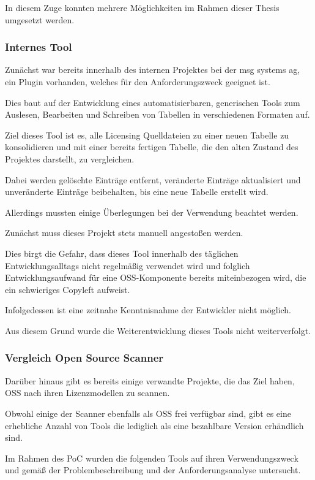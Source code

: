 In diesem Zuge konnten mehrere Möglichkeiten im Rahmen dieser Thesis umgesetzt werden.

\subsubsection{Internes Tool}

Zunächst war bereits innerhalb des internen Projektes bei der msg systems ag, ein Plugin vorhanden, welches für den Anforderungszweck geeignet ist. 

Dies baut auf der Entwicklung eines automatisierbaren, generischen Tools zum Auslesen, Bearbeiten und Schreiben von Tabellen in verschiedenen Formaten auf. 

Ziel dieses Tool ist es, alle Licensing Quelldateien zu einer neuen Tabelle zu konsolidieren und mit einer bereits fertigen Tabelle, die den alten Zustand des Projektes darstellt, zu vergleichen. 

Dabei werden gelöschte Einträge entfernt, veränderte Einträge aktualisiert und unveränderte Einträge beibehalten, bis eine neue Tabelle erstellt wird.

Allerdings mussten einige Überlegungen bei der Verwendung beachtet werden. 

Zunächst muss dieses Projekt stets manuell angestoßen werden. 

Dies birgt die Gefahr, dass dieses Tool innerhalb des täglichen Entwicklungsalltags nicht regelmäßig verwendet wird und folglich Entwicklungsaufwand für eine OSS-Komponente bereits miteinbezogen wird, die ein schwieriges Copyleft aufweist. 

Infolgedessen ist eine zeitnahe Kenntnisnahme der Entwickler nicht möglich. 

Aus diesem Grund wurde die Weiterentwicklung dieses Tools nicht weiterverfolgt. 

\subsubsection{Vergleich Open Source Scanner}

Darüber hinaus gibt es bereits einige verwandte Projekte, die das Ziel haben, OSS nach ihren Lizenzmodellen zu scannen. 

Obwohl einige der Scanner ebenfalls als OSS frei verfügbar sind, gibt es eine erhebliche Anzahl von Tools die lediglich als eine bezahlbare Version erhändlich sind.  

Im Rahmen des PoC wurden die folgenden Tools auf ihren Verwendungszweck und gemäß der Problembeschreibung und der Anforderungsanalyse untersucht. 

